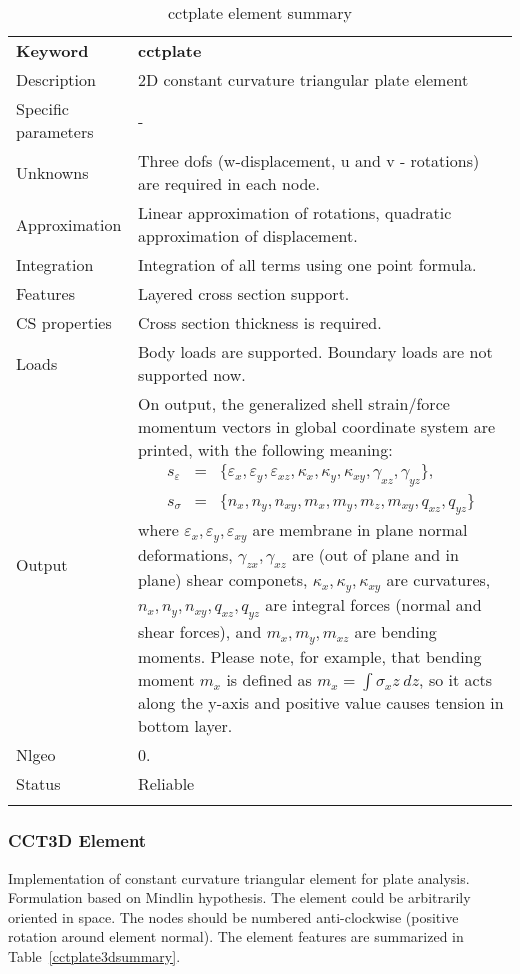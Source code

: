 \documentclass[a4paper]{article}
\newcommand{\param}[1]{\texttt{#1}} %
\newcommand{\templabel}{}%
\newcommand{\tempcaption}{}%
\newcounter{nelpar}
\newenvironment{elementsummary}[5]{%
  \gdef\tempcaption{#4}%
  \gdef\templabel{#5}%
  \setcounter{nelpar}{0}%
  \begin{center} %
    \begin{table}[!htb] %
      \begin{tabular}{|l|p{9cm}|}\hline %
        {\bf Keyword} & \bf{#1}\\ %
        {Description} & {#2}\\ %
        {Specific parameters} & {#3}\\ \hline %
}{
  \\ \hline %
      \end{tabular}%
      \caption{\tempcaption}%
      \label{\templabel}%
    \end{table}%
  \end{center}%
}
\newcommand{\elementParam}[1]{%
  \ifthenelse{\value{nelpar}>0} %
             {&{#1}}%
             {\setcounter{nelpar}{1}Parameters&{#1}}%
             \\%
}
\newcommand{\elementDescription}[2]{{#1} & {#2}\\ }
\begin{document}
\begin{elementsummary}{cctplate}{2D constant curvature triangular plate element}{-}{cctplate element summary}{cctplatesummary}
\elementDescription{Unknowns}{Three dofs (w-displacement, u and v - rotations) are required in each node.}
\elementDescription{Approximation}{Linear approximation of rotations, quadratic approximation of displacement.}
\elementDescription{Integration}{Integration of all terms using one point formula.}
\elementDescription{Features}{Layered cross section support.}
\elementDescription{CS properties}{Cross section thickness is required.}
\elementDescription{Loads}{Body loads are supported. Boundary loads are not supported now.}
\elementDescription{Output}{On output, the generalized shell strain/force momentum vectors in global coordinate system are printed, with the following meaning:
\begin{eqnarray*}
s_{\varepsilon}&=&\{\varepsilon_x, \varepsilon_y, \varepsilon_{xz}, \kappa_x, \kappa_y, \kappa_{xy}, \gamma_{xz}, \gamma_{yz}\},\\
s_{\sigma}&=&\{n_x, n_y, n_{xy}, m_x, m_y, m_z, m_{xy}, q_{xz}, q_{yz}\}
\end{eqnarray*}
where $\varepsilon_x, \varepsilon_y, \varepsilon_{xy}$ are membrane in plane normal deformations, $\gamma_{zx}, \gamma_{xz}$ are (out of plane and in plane) shear componets, $\kappa_x, \kappa_y, \kappa_{xy}$ are curvatures, $n_x, n_y, n_{xy}, q_{xz}, q_{yz}$ are integral forces (normal and shear forces), and $m_x, m_y, m_{xz}$ are bending moments. 
Please note, for example, that bending moment $m_x$ is defined as $m_x=\int \sigma_x z\ dz$, so it acts along the y-axis and positive value causes tension in bottom layer.}
\elementDescription{Nlgeo}{0.}
\elementDescription{Status}{Reliable}
\end{elementsummary}


\subsubsection {CCT3D Element}
Implementation of constant curvature triangular element for plate
analysis. Formulation based on Mindlin hypothesis. The element could be arbitrarily oriented in space. 
The nodes should be numbered anti-clockwise (positive rotation around element normal). 
The element features are summarized in Table~\ref{cctplate3dsummary}.
\end{document}
